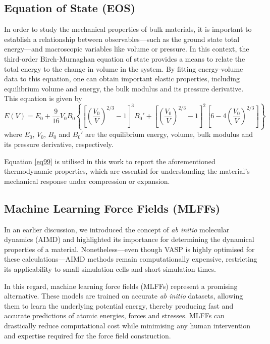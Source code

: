 \subsection{Equation of State (EOS)}
In order to study the mechanical properties of bulk materials, it is important to establish a relationship between observables---such as the ground state total energy---and macroscopic variables like volume or pressure. In this context, the third-order Birch-Murnaghan equation of state\supercite{Birch1947,poirier2000introduction} provides a means to relate the total energy to the change in volume in the system. By fitting energy-volume data to this equation, one can obtain important elastic properties, including equilibrium volume and energy, the bulk modulus and its pressure derivative. This equation is given by 
\begin{equation}
    \label{eq99}
     E(V) = E_0 + \frac{9}{16} V_0 B_0 \left\{ \left[ \left( \frac{V_0}{V} \right)^{2/3} 
     - 1 \right]^3 B_0' + \left[ \left( \frac{V_0}{V} \right)^{2/3} - 1 \right]^2 \left[6 - 4 \left( \frac{V_0}{V} \right)^{2/3} \right] \right\}
\end{equation}
where $E_0$, $V_0$, $B_0$ and $B_0'$ are the equilibrium energy, volume, bulk modulus and its pressure derivative, respectively.

Equation \ref{eq99} is utilised in this work to report the aforementioned thermodynamic properties, which are essential for understanding the material's mechanical response under compression or expansion. 

\subsection{Machine Learning Force Fields (MLFFs)}
In an earlier discussion, we introduced the concept of \emph{ab initio} molecular dynamics (AIMD) and highlighted its importance for determining the dynamical properties of a material. Nonetheless---even though VASP is highly optimised for these calculations---AIMD methods remain computationally expensive, restricting its applicability to small simulation cells and short simulation times. 

In this regard, machine learning force fields (MLFFs) represent a promising alternative. These models are trained on accurate \emph{ab initio} datasets, allowing them to learn the underlying potential energy, thereby producing fast and accurate predictions of atomic energies, forces and stresses. MLFFs can drastically reduce computational cost while minimising any human intervention and expertise required for the force field construction.

